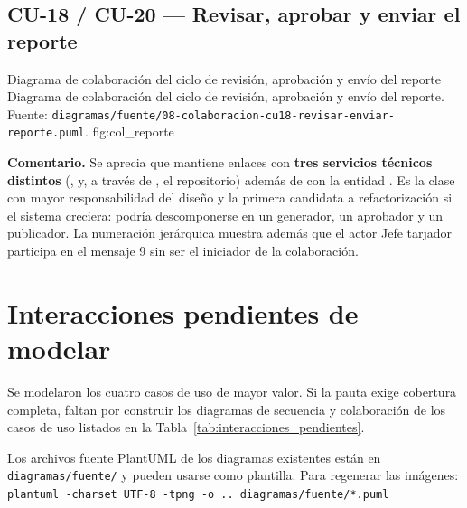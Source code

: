 \subsection{CU-18 / CU-20 --- Revisar, aprobar y enviar el reporte}
\label{subsec:col_reporte}

{Diagrama de colaboración del ciclo de revisión, aprobación y envío del reporte}
{Diagrama de colaboración del ciclo de revisión, aprobación y envío del reporte. Fuente:
\texttt{diagramas/fuente/08-colaboracion-cu18-revisar-enviar-reporte.puml}.}
{fig:col_reporte}

\textbf{Comentario.} Se aprecia que  mantiene enlaces con \textbf{tres
servicios técnicos distintos} (,  y, a través de
, el repositorio) además de con la entidad . Es la clase con mayor
responsabilidad del diseño y la primera candidata a refactorización si el sistema creciera: podría
descomponerse en un generador, un aprobador y un publicador. La numeración jerárquica muestra
además que el actor Jefe tarjador participa en el mensaje 9 sin ser el iniciador de la
colaboración.

\section{Interacciones pendientes de modelar}
\label{sec:interacciones_pendientes}

\begin{pendiente}
Se modelaron los cuatro casos de uso de mayor valor. Si la pauta exige cobertura completa, faltan
por construir los diagramas de secuencia y colaboración de los casos de uso listados en la
Tabla~\ref{tab:interacciones_pendientes}.

\medskip

Los archivos fuente PlantUML de los diagramas existentes están en \texttt{diagramas/fuente/} y
pueden usarse como plantilla. Para regenerar las imágenes:
\texttt{plantuml -charset UTF-8 -tpng -o .. diagramas/fuente/*.puml}
\end{pendiente}


